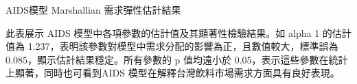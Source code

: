 %     

\begin{table}[H]
    \caption{AIDS模型 Marshallian 需求彈性估計結果}
    \center
    \footnotesize
      \label{aids_marshall}
\end{table}
\vspace{-2em}
\begin{singlespace}
    \begin{footnotesize}
        \raggedright
         此表展示 AIDS 模型中各項參數的估計值及其顯著性檢驗結果。如 alpha 1 的估計值為 1.237，表明該參數對模型中需求分配的影響為正，且數值較大，標準誤為 0.085，顯示估計結果穩定。所有參數的 p 值均遠小於 0.05，表示這些參數在統計上顯著，同時也可看到AIDS 模型在解釋台灣飲料市場需求方面具有良好表現。 
    \end{footnotesize}
\end{singlespace}

